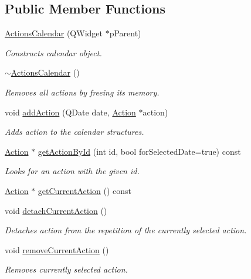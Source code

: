 \subsection*{Public Member Functions}
\begin{DoxyCompactItemize}
\item 
\hyperlink{class_actions_calendar_a10ec91c83206ce7f89d00b4c3a1d87e3}{Actions\-Calendar} (Q\-Widget $\ast$p\-Parent)
\begin{DoxyCompactList}\small\item\em Constructs calendar object. \end{DoxyCompactList}\item 
\hyperlink{class_actions_calendar_aa3ab268cb557d50c5cbbb65c34a3b701}{$\sim$\-Actions\-Calendar} ()
\begin{DoxyCompactList}\small\item\em Removes all actions by freeing its memory. \end{DoxyCompactList}\item 
void \hyperlink{class_actions_calendar_a09bd42b81f9208f1370918036eff4284}{add\-Action} (Q\-Date date, \hyperlink{class_action}{Action} $\ast$action)
\begin{DoxyCompactList}\small\item\em Adds action to the calendar structures. \end{DoxyCompactList}\item 
\hyperlink{class_action}{Action} $\ast$ \hyperlink{class_actions_calendar_a26d6b3037086b4794bafaea2e2934256}{get\-Action\-By\-Id} (int id, bool for\-Selected\-Date=true) const 
\begin{DoxyCompactList}\small\item\em Looks for an action with the given id. \end{DoxyCompactList}\item 
\hyperlink{class_action}{Action} $\ast$ \hyperlink{class_actions_calendar_aead746bf37764a0a11e1c0e81040f5c3}{get\-Current\-Action} () const 
\item 
void \hyperlink{class_actions_calendar_aeba5e76ac0b5c0811b62e498131760f6}{detach\-Current\-Action} ()
\begin{DoxyCompactList}\small\item\em Detaches action from the repetition of the currently selected action. \end{DoxyCompactList}\item 
void \hyperlink{class_actions_calendar_acb13aa034033c2912c706c895ae740a7}{remove\-Current\-Action} ()
\begin{DoxyCompactList}\small\item\em Removes currently selected action. \end{DoxyCompactList}\item 

\end{DoxyCompactItemize}
